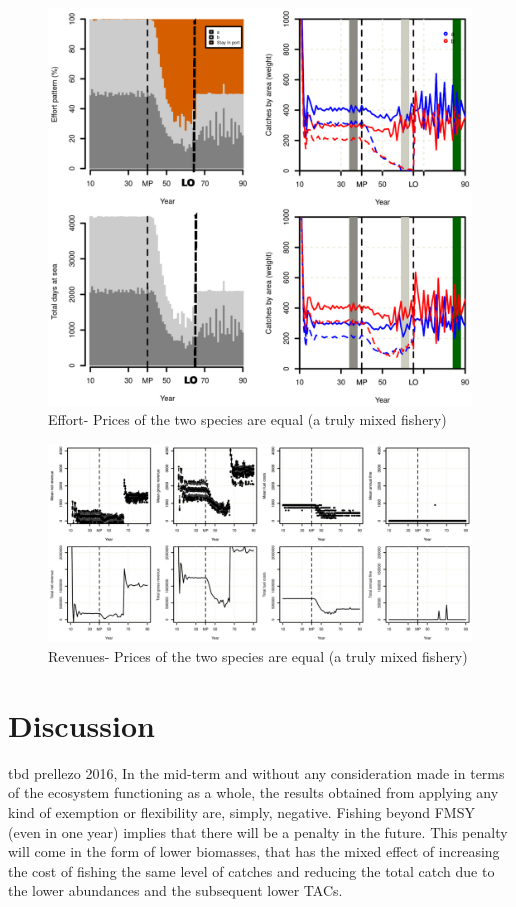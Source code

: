 \documentclass[12pt,oneline,a4paper,numbib]{ouparticle}
\numberwithin{equation}{subsection} %
\begin{document}
\begin{figure}[!ht]
\centering
\includegraphics[width=.82\textwidth]{Figures/figureffort.eps} 
\caption{Effort- Prices of the two species are equal (a truly mixed fishery)}
\end{figure}

\begin{figure}[!ht]
\centering
\includegraphics[width=\textwidth]{Figures/figurerevenue.eps} 
\caption{Revenues- Prices of the two species are equal (a truly mixed fishery)}
\end{figure}

\newpage
\section{Discussion}
\label{sec4}
tbd
prellezo 2016, In the mid-term and without any consideration made in terms of the ecosystem functioning as a whole, the results obtained from applying any kind of exemption or flexibility are, simply, negative. Fishing beyond FMSY (even in one year) implies that there will be a penalty in the future. This penalty will come in the form of lower biomasses, that has the mixed effect of increasing the cost of fishing the same level of catches and reducing the total catch due to the lower abundances and the subsequent lower TACs.
\end{document}
